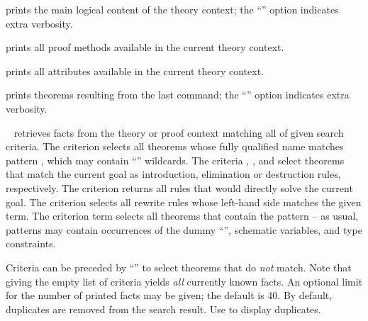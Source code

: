 \begin{isabellebody}
\begin{isamarkuptext}
\begin{description}
  \item \hyperlink{command.print-theory}{\mbox{}} prints the main logical content of
  the theory context; the ``\isa{{\isachardoublequote}{\isacharbang}{\isachardoublequote}}'' option indicates extra
  verbosity.

  \item \hyperlink{command.print-methods}{\mbox{}} prints all proof methods
  available in the current theory context.
  
  \item \hyperlink{command.print-attributes}{\mbox{}} prints all attributes
  available in the current theory context.
  
  \item \hyperlink{command.print-theorems}{\mbox{}} prints theorems resulting from the
  last command; the ``\isa{{\isachardoublequote}{\isacharbang}{\isachardoublequote}}'' option indicates extra verbosity.
  
  \item \hyperlink{command.find-theorems}{\mbox{}}~ retrieves facts
  from the theory or proof context matching all of given search
  criteria.  The criterion  selects all theorems
  whose fully qualified name matches pattern , which may
  contain ``\isa{{\isachardoublequote}{\isacharasterisk}{\isachardoublequote}}'' wildcards.  The criteria ,
  , and  select theorems that match the
  current goal as introduction, elimination or destruction rules,
  respectively.  The criterion  returns all rules
  that would directly solve the current goal.  The criterion
   selects all rewrite rules whose left-hand side
  matches the given term.  The criterion term  selects all
  theorems that contain the pattern  -- as usual, patterns
  may contain occurrences of the dummy ``\isa{{\isacharunderscore}}'', schematic
  variables, and type constraints.
  
  Criteria can be preceded by ``\isa{{\isachardoublequote}{\isacharminus}{\isachardoublequote}}'' to select theorems that
  do \emph{not} match. Note that giving the empty list of criteria
  yields \emph{all} currently known facts.  An optional limit for the
  number of printed facts may be given; the default is 40.  By
  default, duplicates are removed from the search result. Use
   to display duplicates.


\end{description}
\end{isamarkuptext}
\end{isabellebody}
